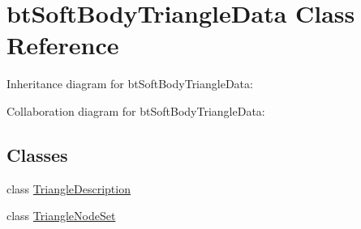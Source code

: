 \hypertarget{classbt_soft_body_triangle_data}{\section{bt\+Soft\+Body\+Triangle\+Data Class Reference}
\label{classbt_soft_body_triangle_data}
}


Inheritance diagram for bt\+Soft\+Body\+Triangle\+Data\+:


Collaboration diagram for bt\+Soft\+Body\+Triangle\+Data\+:
\subsection*{Classes}
\begin{DoxyCompactItemize}
\item 
class \hyperlink{classbt_soft_body_triangle_data_1_1_triangle_description}{Triangle\+Description}
\item 
class \hyperlink{classbt_soft_body_triangle_data_1_1_triangle_node_set}{Triangle\+Node\+Set}
\end{DoxyCompactItemize}
